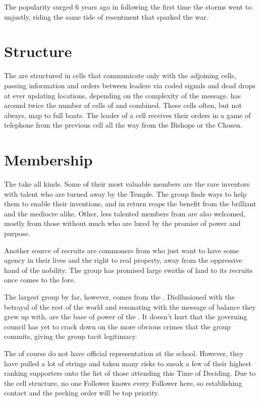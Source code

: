 \documentclass[blue]{GL2020}
\begin{document}
The \pGoaties{} popularity surged 6 years ago in \pShip{} following the first time the storms went to \pShip{} unjustly, riding the same tide of resentment that sparked the war.

\section*{Structure}
The \pGoaties{} are structured in cells that communicate only with the adjoining cells, passing information and orders between leaders via coded signals and dead drops at ever updating locations, depending on the complexity of the message. \pShip{} has around twice the number of cells of \pTech{} and \pFarm{} combined. These cells often, but not always, map to full boats. The leader of a cell receives their orders in a game of telephone from the previous cell all the way from the Bishops or the Chosen.

\section*{Membership}
The \pGoaties{} take all kinds. Some of their most valuable members are the rare inventors with talent who are turned away by the Temple. The group finds ways to help them to enable their inventions, and in return reaps the benefit from the brilliant and the mediocre alike. Other, less talented members from \pTech{} are also welcomed, mostly from those without much who are lured by the promise of power and purpose.

Another source of recruits are commoners from \pFarm{} who just want to have some agency in their lives and the right to real property, away from the oppressive hand of the nobility. The group has promised large swaths of land to its \pFarm{} recruits once \cGenesis{} comes to the fore.

The largest group by far, however, comes from the \pShip{}. Disillusioned with the betrayal of the rest of the world and resonating with the message of balance they grew up with, \pShippies{} are the base of power of the \pGoaties{}. It doesn’t hurt that the governing council has yet to crack down on the more obvious crimes that the group commits, giving the group tacit legitimacy.

The \pGoaties{} of course do not have official representation at the school. However, they have pulled a lot of strings and taken many risks to sneak a few of their highest ranking supporters onto the list of those attending this Time of Deciding. Due to the cell structure, no one Follower knows every Follower here, so establishing contact and the pecking order will be top priority. 
\end{document}
